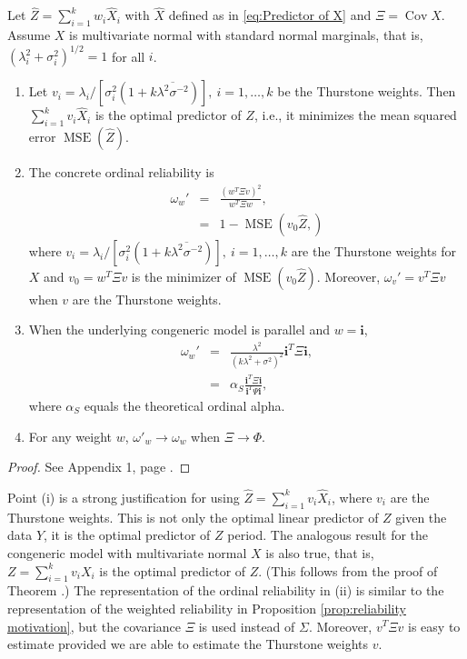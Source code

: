 \documentclass[twoside]{article}
\DeclareMathOperator{\Cov}{Cov}
\DeclareMathOperator{\MSE}{MSE}
\renewcommand{\sqrt}[1]{{(#1)^{1/2}}}
\begin{document}
\begin{thm}
\label{thm:omega-prime}Let $\hat{Z}=\sum_{i=1}^{k}w_{i}\hat{X}_{i}$
with $\hat{X}$ defined as in \eqref{eq:Predictor of X} and $\Xi=\Cov\hat{X}$.
Assume $X$ is multivariate normal with standard normal marginals,
that is, $\sqrt{\lambda_{i}^{2}+\sigma_{i}^{2}}=1$ for all $i$.
\begin{enumerate}[label=(\roman*)]
\item Let  $v_{i}=\lambda_{i}/[\sigma_{i}^{2}(1+k\overline{\lambda^{2}\sigma^{-2}})],\:i=1,\ldots,k$ be the Thurstone weights. Then $\sum_{i=1}^{k}v_{i}\hat{X}_{i}$
is the optimal predictor of $Z$, i.e., it minimizes the mean squared
error $\MSE(\hat{Z})$.
\item The concrete ordinal reliability is
\begin{eqnarray}
\omega_{w}' & = & \frac{(w^{T}\Xi v)^{2}}{w^{T}\Xi w},\label{eq:Omega prime}\\
 & = & 1-\MSE(v_{0}\hat{Z},)\nonumber 
\end{eqnarray}
where $v_{i}=\lambda_{i}/[\sigma_{i}^{2}(1+k\overline{\lambda^{2}\sigma^{-2}})],\:i=1,\ldots,k$
are the Thurstone weights for $X$ and $v_{0}=w^{T}\Xi v$ is the
minimizer of $\MSE(v_{0}\hat{Z})$. Moreover, $\omega_{v}'=v^{T}\Xi v$ when $v$
are the Thurstone weights.
\item When the underlying congeneric model is parallel and $w=\mathbf{i}$,
\begin{eqnarray}
\omega_{w}' & = & \frac{\lambda^{2}}{(k\lambda^{2}+\sigma^{2})^{2}}\mathbf{i}^{T}\Xi\mathbf{i},\label{eq:Alpha prime}\\
 & = & \alpha_S\frac{\mathbf{i}^{T}\Xi\mathbf{i}}{\mathbf{i}^{T}\Psi\mathbf{i}},\nonumber 
\end{eqnarray}
where $\alpha_S$ equals the theoretical ordinal alpha.
\item For any weight $w$, $\omega'_{w}\to\omega_{w}$ when $\Xi\to\Phi$. 
\end{enumerate}
\end{thm}

\begin{proof}
See Appendix 1, page \pageref{proof:omega-prime}.
\end{proof}
Point (i) is a strong justification for using $\hat{Z}=\sum_{i=1}^{k}v_{i}\hat{X}_{i}$,
where $v_{i}$ are the Thurstone weights. This is not only the optimal
linear predictor of $Z$ given the data $Y$, it is the optimal predictor
of $Z$ period. The analogous result for the congeneric model with
multivariate normal $X$ is also true, that is, $Z=\sum_{i=1}^{k}v_{i}X_{i}$
is the optimal predictor of $Z$. (This follows from the proof of
Theorem \pageref{thm:omega-prime}.) The representation of the ordinal
reliability in (ii) is similar to the representation of the weighted
reliability in Proposition \ref{prop:reliability motivation}, but the covariance $\Xi$ is used
instead of $\Sigma$. Moreover, $v^{T}\Xi v$ is easy to estimate
provided we are able to estimate the Thurstone weights $v$. 
\end{document}
